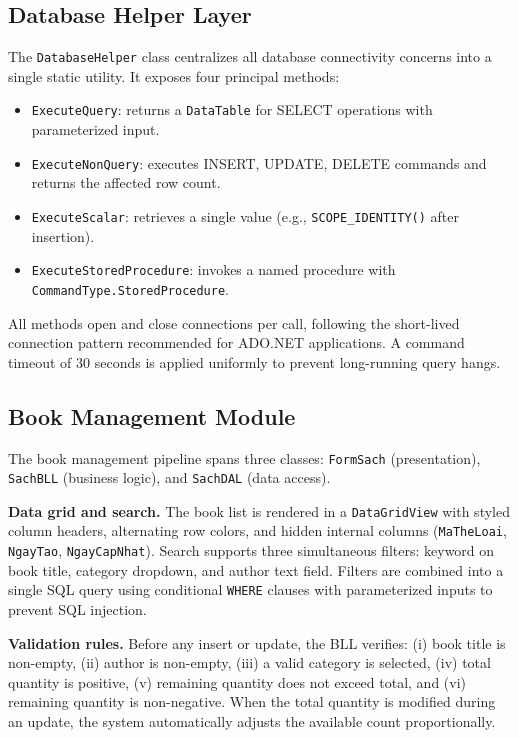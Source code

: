 \documentclass[12pt,a4paper]{article}
\begin{document}
\subsection{Database Helper Layer}
The \texttt{DatabaseHelper} class centralizes all database connectivity concerns into a single static utility. It exposes four principal methods:
\begin{itemize}[leftmargin=1.5cm]
    \item \texttt{ExecuteQuery}: returns a \texttt{DataTable} for SELECT operations with parameterized input.
    \item \texttt{ExecuteNonQuery}: executes INSERT, UPDATE, DELETE commands and returns the affected row count.
    \item \texttt{ExecuteScalar}: retrieves a single value (e.g., \texttt{SCOPE\_IDENTITY()} after insertion).
    \item \texttt{ExecuteStoredProcedure}: invokes a named procedure with \texttt{CommandType.StoredProcedure}.
\end{itemize}
All methods open and close connections per call, following the short-lived connection pattern recommended for ADO.NET applications. A command timeout of 30 seconds is applied uniformly to prevent long-running query hangs.

\subsection{Book Management Module}
The book management pipeline spans three classes: \texttt{FormSach} (presentation), \texttt{SachBLL} (business logic), and \texttt{SachDAL} (data access).

\textbf{Data grid and search.} The book list is rendered in a \texttt{DataGridView} with styled column headers, alternating row colors, and hidden internal columns (\texttt{MaTheLoai}, \texttt{NgayTao}, \texttt{NgayCapNhat}). Search supports three simultaneous filters: keyword on book title, category dropdown, and author text field. Filters are combined into a single SQL query using conditional \texttt{WHERE} clauses with parameterized inputs to prevent SQL injection.

\textbf{Validation rules.} Before any insert or update, the BLL verifies: (i) book title is non-empty, (ii) author is non-empty, (iii) a valid category is selected, (iv) total quantity is positive, (v) remaining quantity does not exceed total, and (vi) remaining quantity is non-negative. When the total quantity is modified during an update, the system automatically adjusts the available count proportionally.
\end{document}

